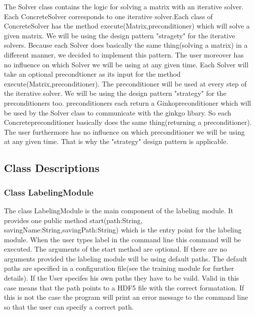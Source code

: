 \documentclass[parskip=full]{scrartcl}
\begin{document}
The Solver class contains the logic for solving a matrix with an \gls{iterative solver}.
Each ConcreteSolver corresponds to one \gls{iterative solver}.Each class of ConcreteSolver has the method execute(Matrix,\gls{preconditioner}) which will solve a given matrix.
We will be using the design pattern "stragety" for the \glspl{iterative solver}.
Because each Solver does basically the same thing(solving a matrix) in a different manner, we decided to implement this pattern.
The user moreover has no influence on which Solver we will be using at any given time.
Each Solver will take an optional precondtioner as its input for the method execute(Matrix,\gls{preconditioner}).
The \gls{preconditioner} will be used at every step of the \gls{iterative solver}.
We will be using the design pattern "\gls{strategy}" for the \glspl{preconditioner} too. \glspl{preconditioner} each return a Ginko\gls{preconditioner} which will be used by the Solver class to communicate with the ginkgo libary.
So each Concrete\gls{preconditioner} basically does the same thing(returning a \gls{preconditioner}).
The user furthermore has no influence on which \gls{preconditioner} we will be using at any given time. That is why the "\gls{strategy}" design pattern is applicable.

\subsection{Class Descriptions}

\subsubsection{Class LabelingModule}
The class LabelingModule is the main component of the labeling module.
It provides one public method start(path:String, savingName:String,savingPath:String) which is the entry point for the labeling module.
When the user types label in the command line this command will be executed.
The arguments of the start method are optional.
If there are no arguments provided the labeling module will be using default paths.
The default paths are specified in a configuration file(see the training module for further details).
If the User specifes his own paths they have to be vaild.
Valid in this case means that the path points to a \gls{HDF5} file with the correct formatation.
If this is not the case the program will print an error message to the command line so that the user can specify a correct path.
\end{document}
